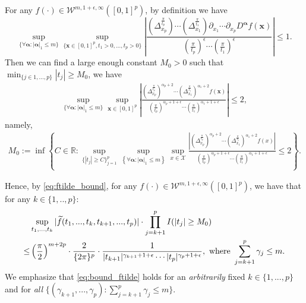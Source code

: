 \documentclass[11pt]{article}
\numberwithin{equation}{section}
\begin{document}
For any $f(\cdot)\in \mathcal{W}^{m,1+\epsilon,\infty}([0,1]^p)$, by definition we have $$\sup_{\{\forall\boldsymbol{\alpha}:|\boldsymbol{\alpha}|_1\leq  m\}}\sup_{\{\boldsymbol{x}\in [0,1]^p,t_1>0,...,t_p>0\}}\left|\frac{\left(\Delta_{x_p}^{\frac{\pi}{t_p}}\right)\cdots\left(\Delta_{x_{1}}^{\frac{\pi}{t_{1}}}\right)\partial_{x_1}\cdots \partial_{x_p}D^{\boldsymbol{\alpha}}f(\boldsymbol{x})}{\left(\frac{\pi}{t_p}\right)^{\epsilon}\cdots \left(\frac{\pi}{t_1}\right)^{\epsilon}}\right|\leq 1.$$
Then we can find a large enough constant $M_0>0$ such that $\min_{\{j\in 1,...,p\}}|t_j|\geq M_0$, we have
\begin{align*}
\sup_{\{\forall\boldsymbol{\alpha}:|\boldsymbol{\alpha}|_1\leq  m\}}	\sup_{\boldsymbol{x}\in[0,1]^p}\left|\frac{\left(\Delta_{x_p}^{\frac{\pi}{t_p}}\right)^{\alpha_p+2}\cdots \left(\Delta_{x_{1}}^{\frac{\pi}{t_{1}}}\right)^{\alpha_{1}+2}f(\boldsymbol{x})}{\left(\frac{\pi}{t_p}\right)^{\alpha_p+1+\epsilon}\cdots \left(\frac{\pi}{t_1}\right)^{\alpha_1+1+\epsilon}}\right|\leq 2,
\end{align*}
namely,
\begin{align}\label{def:M0}
	M_0:=\inf\left\{C\in\mathbb{R}:\sup_{\{|t_j|\geq C\}_{j=1}^p }\sup_{\left\{\forall \boldsymbol{\alpha}:|\boldsymbol{\alpha}|_1\leq m\right\}}\sup_{x\in \mathcal{X}}\frac{\left|\left(\Delta_{x_p}^{\frac{\pi}{t_p}}\right)^{\alpha_p+2}\cdots\left(\Delta_{x_{1}}^{\frac{\pi}{t_{1}}}\right)^{\alpha_1+2}f(x)\right|}{\left(\frac{\pi}{t_p}\right)^{\alpha_p+1+\epsilon}\cdots\left(\frac{\pi}{t_1}\right)^{\alpha_1+1+\epsilon}}\leq 2\right\}.
\end{align}

Hence, by \eqref{eq:ftilde_bound}, for any $f(\cdot)\in \mathcal{W}^{m,1+\epsilon,\infty}([0,1]^p)$, we have that for any $k\in \{1,..,p\}$:
\begin{align}
	&\sup_{t_1,...,t_k}|\widetilde{f}(t_1,...,t_k,t_{k+1},...,t_p)|\cdot \prod_{j=k+1}^pI(|t_j|\geq M_0) \notag \\
	\leq& \left(\frac{\pi}{2}\right)^{m+2p}\cdot\frac{2}{\{2\pi\}^{p}}\cdot   \frac{1}{|t_{k+1}|^{\gamma_{k+1}+1+\epsilon}\cdots |t_p|^{\gamma_{p}+1+\epsilon}}, \ \text{where}\   \sum_{j=k+1}^p\gamma_{j}\leq m.\label{eq:bound_ftilde}
\end{align}
We emphasize that \eqref{eq:bound_ftilde} holds for an \emph{arbitrarily} fixed $k\in \{1,...,p\}$ and for \emph{all} $\{(\gamma_{k+1},...,\gamma_p):\sum_{j=k+1}^p\gamma_{j}\leq m\}$.
\end{document}
